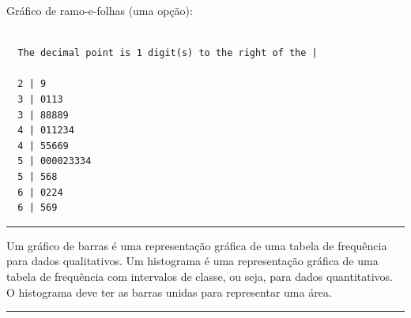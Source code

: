 \documentclass[a4paper,11pt,fleqn]{article}\usepackage[]{graphicx}\usepackage[]{color}
\makeatletter
\newenvironment{kframe}{%
 \def\at@end@of@kframe{}%
 \ifinner\ifhmode%
  \def\at@end@of@kframe{\end{minipage}}%
  \begin{minipage}{\columnwidth}%
 \fi\fi%
 \def\FrameCommand##1{\hskip\@totalleftmargin \hskip-\fboxsep
 \colorbox{shadecolor}{##1}\hskip-\fboxsep
     \hskip-\linewidth \hskip-\@totalleftmargin \hskip\columnwidth}%
 \MakeFramed {\advance\hsize-\width
   \@totalleftmargin\z@ \linewidth\hsize
   \@setminipage}}%
 {\par\unskip\endMakeFramed%
 \at@end@of@kframe}
\newenvironment{knitrout}{}{} %
\theoremstyle{definition}
\makeatother
\begin{document}
\begin{compactenum}[7.]
\begin{knitrout}
{}



\end{knitrout}

Gráfico de ramo-e-folhas (uma opção):

\begin{knitrout}\small
{}\color{fgcolor}\begin{kframe}
\begin{verbatim}

  The decimal point is 1 digit(s) to the right of the |

  2 | 9
  3 | 0113
  3 | 88889
  4 | 011234
  4 | 55669
  5 | 000023334
  5 | 568
  6 | 0224
  6 | 569
\end{verbatim}
\end{kframe}
\end{knitrout}

\end{compactenum}

\vspace{0.3cm}
\hrule
\vspace{0.3cm}

\begin{compactenum}[8.]
\item Um gráfico de barras é uma representação gráfica de uma tabela de
  frequência para dados qualitativos. Um histograma é uma representação
  gráfica de uma tabela de frequência com intervalos de classe, ou seja,
  para dados quantitativos. O histograma deve ter as barras unidas para
  representar uma área.
\end{compactenum}

\vspace{0.3cm}
\hrule
\vspace{0.3cm}
\end{document}
